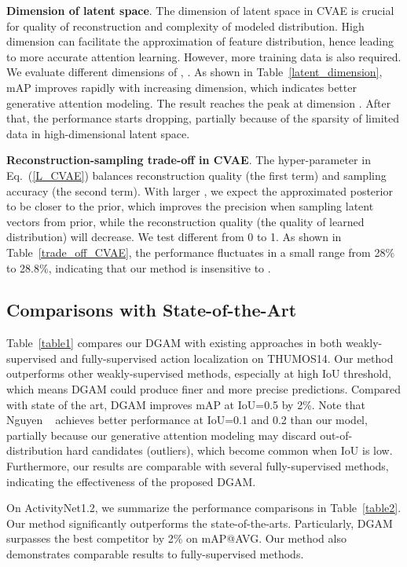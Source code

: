 \documentclass[10pt,twocolumn,letterpaper]{article}
\begin{document}
\textbf{Dimension of latent space}.
The dimension of latent space in CVAE is crucial for quality of reconstruction and complexity of modeled distribution.
High dimension can facilitate the approximation of feature distribution, hence leading to more accurate attention learning.
However, more training data is also required.
We evaluate different dimensions of , . As shown in Table~\ref{latent_dimension}, mAP improves rapidly with increasing dimension, which indicates better generative attention modeling.
The result reaches the peak at dimension . After that, the performance starts dropping, partially because of the sparsity of limited data in high-dimensional latent space.


\textbf{Reconstruction-sampling trade-off in CVAE}. The hyper-parameter  in Eq.~(\ref{L_CVAE}) balances reconstruction quality (the first term) and sampling accuracy (the second term).
With larger , we expect the approximated posterior to be closer to the prior, which improves the precision when sampling latent vectors from prior, while the reconstruction quality (\ie the quality of learned distribution) will decrease.
We test different  from 0 to 1. As shown in Table~\ref{trade_off_CVAE}, the performance fluctuates in a small range from 28\% to 28.8\%, indicating that our method is insensitive to .


\subsection{Comparisons with State-of-the-Art}

Table~\ref{table1} compares our DGAM with existing approaches in both weakly-supervised and fully-supervised action localization on THUMOS14.
Our method outperforms other weakly-supervised methods, especially at high IoU threshold, which means DGAM could produce finer and more precise predictions.
Compared with state of the art, DGAM improves mAP at IoU=0.5 by 2\%.
Note that Nguyen \etal~\cite{nguyen2019weakly} achieves better performance at IoU=0.1 and 0.2 than our model, partially because our generative attention modeling may discard out-of-distribution hard candidates (outliers), which become common when IoU is low.
Furthermore, our results are comparable with several fully-supervised methods, indicating the effectiveness of the proposed DGAM.



On ActivityNet1.2, we summarize the performance comparisons in Table~\ref{table2}.
Our method significantly outperforms the state-of-the-arts.
Particularly, DGAM surpasses the best competitor by 2\% on mAP@AVG.
Our method also demonstrates comparable results to fully-supervised methods.
\end{document}
